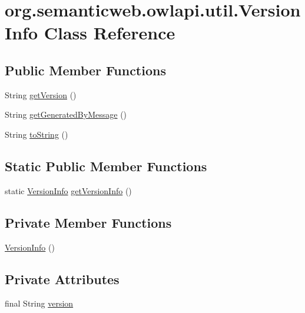\hypertarget{classorg_1_1semanticweb_1_1owlapi_1_1util_1_1_version_info}{\section{org.\-semanticweb.\-owlapi.\-util.\-Version\-Info Class Reference}
\label{classorg_1_1semanticweb_1_1owlapi_1_1util_1_1_version_info}
}
\subsection*{Public Member Functions}
\begin{DoxyCompactItemize}
\item 
String \hyperlink{classorg_1_1semanticweb_1_1owlapi_1_1util_1_1_version_info_a3854b6b9b1ea09148f0e6d78b393e733}{get\-Version} ()
\item 
String \hyperlink{classorg_1_1semanticweb_1_1owlapi_1_1util_1_1_version_info_a423ca96d12d762252dd4c2e0fbfe4ad1}{get\-Generated\-By\-Message} ()
\item 
String \hyperlink{classorg_1_1semanticweb_1_1owlapi_1_1util_1_1_version_info_a3f5432e2a4dbe13023c0d64d2d62d515}{to\-String} ()
\end{DoxyCompactItemize}
\subsection*{Static Public Member Functions}
\begin{DoxyCompactItemize}
\item 
static \hyperlink{classorg_1_1semanticweb_1_1owlapi_1_1util_1_1_version_info}{Version\-Info} \hyperlink{classorg_1_1semanticweb_1_1owlapi_1_1util_1_1_version_info_a42658b0d554f9141e8ad54a55f77f6c6}{get\-Version\-Info} ()
\end{DoxyCompactItemize}
\subsection*{Private Member Functions}
\begin{DoxyCompactItemize}
\item 
\hyperlink{classorg_1_1semanticweb_1_1owlapi_1_1util_1_1_version_info_ad2062e722db7f57258e80c304d7e5773}{Version\-Info} ()
\end{DoxyCompactItemize}
\subsection*{Private Attributes}
\begin{DoxyCompactItemize}
\item 
final String \hyperlink{classorg_1_1semanticweb_1_1owlapi_1_1util_1_1_version_info_aea1a5cd3849c501b13917dbfce69a09a}{version}
\end{DoxyCompactItemize}
